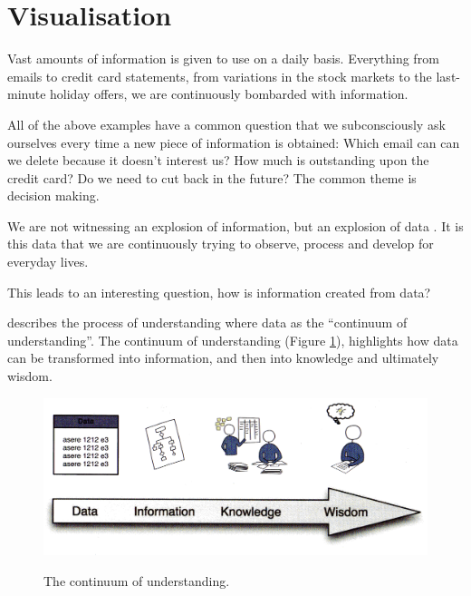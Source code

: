 \section{Visualisation}

Vast amounts of information is given to use on a daily basis. Everything from 
emails to credit card statements, from variations in the stock markets to the 
last-minute holiday offers, we are continuously bombarded with information.

All of the above examples have a common question that we subconsciously ask 
ourselves every time a new piece of information is obtained: Which email can 
can we delete because it doesn't interest us?  How much is outstanding upon 
the credit card? Do we need to cut back in the future? The common theme is
decision making.

We are not witnessing an explosion of information, but an explosion of data 
\citep{riccardo09}. It is this data that we are continuously trying to observe,
process and develop for everyday lives.

This leads to an interesting question, how is information created from data?

\citep{jacobson09} describes the process of understanding where data as the 
``continuum of understanding''. The continuum of understanding 
(Figure \ref{fig:datawisdom}), highlights how data can be transformed into 
information, and then into knowledge and ultimately wisdom.

\begin{figure}[H]
  \centering
    \includegraphics[scale=1.2]{chapter3/visualisation/data_wisdom.png}
  \label{fig:datawisdom}
  \caption[The continuum of understanding]
          {The continuum of understanding.}
\end{figure}

